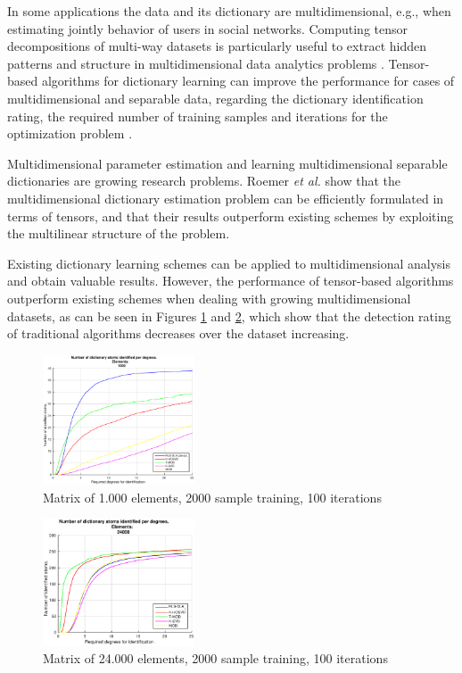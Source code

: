 \documentclass[conference]{IEEEtran}
\begin{document}
In some applications the data and its dictionary are multidimensional, e.g., when estimating jointly behavior of users in social networks. Computing tensor decompositions of multi-way datasets is particularly useful to extract hidden patterns and structure in multidimensional data analytics problems \cite{kolda2009tensor}. Tensor-based algorithms for dictionary learning can improve the performance for cases of multidimensional and separable data, regarding the dictionary identification rating, the required number of training samples and iterations for the optimization problem \cite{roemer2014tensor}. 

Multidimensional parameter estimation and learning multidimensional separable dictionaries are growing research problems. Roemer \emph{et al.} \cite{roemer2014tensor} show that the multidimensional dictionary estimation problem can be efficiently formulated in terms of tensors, and that their results outperform existing schemes by exploiting the multilinear structure of the problem.

Existing dictionary learning schemes can be applied to multidimensional analysis and obtain valuable results. However, the performance of tensor-based algorithms outperform existing schemes when dealing with growing multidimensional datasets, as can be seen in Figures \ref{fig:fig1} and \ref{fig:fig2}, which show that the detection rating of traditional algorithms decreases over the dataset increasing.

\begin{figure}[!htb]
     \centering 
	 \includegraphics[width=0.4\textwidth]{figures/5_20_2000_1000_100.eps}
     \caption{Matrix of 1.000 elements, 2000 sample training, 100 iterations}
     \label{fig:fig1}
\end{figure}

\begin{figure}[!htb]
     \centering 
	 \includegraphics[width=0.4\textwidth]{figures/5_20_2000_24000_100.eps}
     \caption{Matrix of 24.000 elements, 2000 sample training, 100 iterations}
     \label{fig:fig2}
\end{figure}
\end{document}
